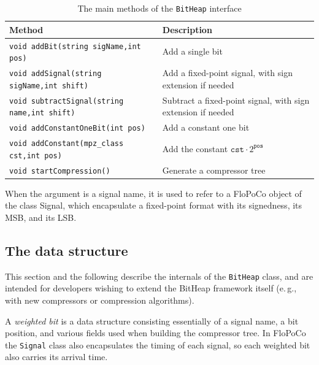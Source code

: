 \documentclass{article}
\begin{document}
\begin{table}[t]
  \centering
    \begin{center}
      \caption{The main methods of the \texttt{BitHeap} interface}
	\label{tab:bit_heap_interface}
  \footnotesize
  
    \begin{tabular}{L{0.5\textwidth}L{0.4\textwidth}}
    	\toprule
		Method                                        & Description                                      \\
    	\midrule
      {\texttt{void addBit(string sigName,int pos)}}      & Add a single bit                                 \\
      {\texttt{void addSignal(string sigName,int shift)}}   & Add a fixed-point signal, with sign extension if needed                       \\
      {\texttt{void subtractSignal(string name,int shift)}} & Subtract a fixed-point signal, with sign extension if needed                  \\
      {\texttt{void addConstantOneBit(int pos)}}  & Add a constant one bit                           \\[1ex]
      {\texttt{void addConstant(mpz\_class cst,int pos)}} & Add the constant $\mathtt{cst}\cdot 2^{\mathtt{pos}}$ \\
      {\texttt{void startCompression()}}          & Generate a compressor tree                       \\
    	\bottomrule
    \end{tabular}
        When the argument is a signal name, it is used to refer to a FloPoCo object of the class Signal, which encapsulate a fixed-point format with its  signedness, its MSB, and its LSB.
    \end{center}
\end{table}



\subsection{The data structure}
This section and the following describe the internals of the \texttt{BitHeap} class, and are intended for developers wishing to extend the BitHeap framework itself (e.\,g., with new compressors or compression algorithms).

A \emph{weighted bit} is a data structure consisting essentially of a signal name, a bit position, and various fields used when building the compressor tree.
In FloPoCo the \texttt{Signal} class also encapsulates the timing of each signal, so each weighted bit also carries its arrival time.
\end{document}
